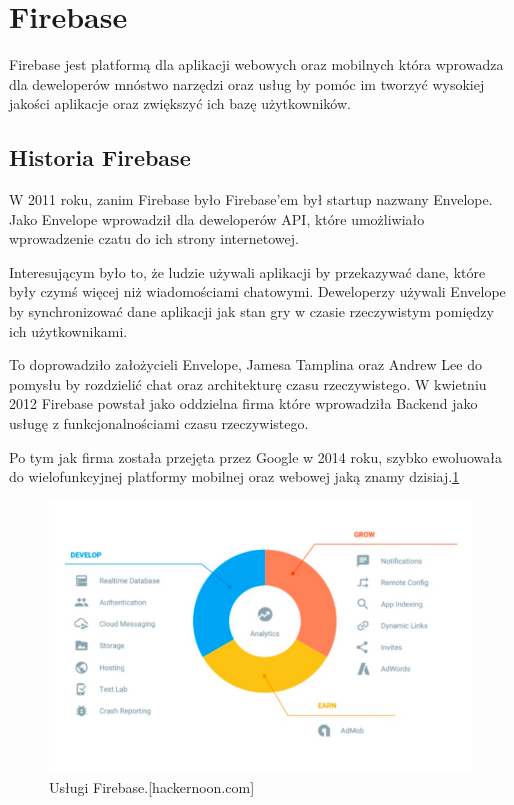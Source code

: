 \section{Firebase}

Firebase jest platformą dla aplikacji webowych oraz mobilnych która wprowadza
dla deweloperów mnóstwo narzędzi oraz usług by pomóc im tworzyć wysokiej jakości aplikacje oraz zwiększyć ich bazę użytkowników.

\subsection{Historia Firebase}

W 2011 roku, zanim Firebase było Firebase’em był startup nazwany Envelope.
Jako Envelope  wprowadził dla deweloperów API, które umożliwiało wprowadzenie czatu do ich strony internetowej.

Interesującym było to, że ludzie używali aplikacji by przekazywać dane, które były czymś więcej niż wiadomościami chatowymi.
Deweloperzy używali Envelope by synchronizować dane aplikacji jak stan gry w czasie rzeczywistym pomiędzy ich użytkownikami.

To doprowadziło założycieli Envelope, Jamesa Tamplina oraz Andrew Lee do pomysłu by rozdzielić chat oraz architekturę czasu rzeczywistego.
W kwietniu 2012 Firebase powstał jako oddzielna firma które wprowadziła Backend jako usługę z funkcjonalnościami czasu rzeczywistego. 

Po tym jak firma została przejęta przez Google w 2014 roku, szybko ewoluowała do wielofunkcyjnej platformy mobilnej oraz webowej jaką znamy dzisiaj.\ref{rys:firebase}

\begin{figure}
\centering\includegraphics[width=.6\textwidth]{img/firebase}
\caption{Usługi Firebase.[hackernoon.com]}\label{rys:firebase}%
\end{figure}

